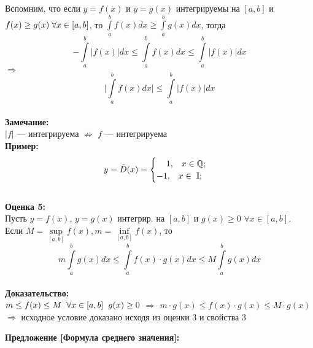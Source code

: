 \documentclass[a4paper,12pt]{article} %
\begin{document}
\begin{enumerate}
     Вспомним, что если $ y = f(x) $ и $ y = g(x) $ интегрируемы на $ [a,b] $ и $ f(x) \geq g(x) \hspace{1 mm} \forall x \in [a, b]$, то $ \int\limits_a^b f(x)dx \geq \int\limits_a^b g(x)dx $, тогда \\ [1 mm]
     $$ - \int\limits_a^b |f(x)| dx \leq \int\limits_a^b f(x) dx \leq \int\limits_a^b |f(x)| dx $$ $\Rightarrow$ \\
     $$ \bigg|\int\limits_a^b f(x)dx\bigg| \leq \int\limits_a^b |f(x)|dx $$ \\ 
     \textbf{Замечание:} \\
     $ |f| $ --- интегрируема $\not\Rightarrow$ $ f $  --- интегрируема \\
     \textbf{Пример:} \\
     \begin{equation*}
    y = \tilde D(x) = \begin{cases}
        \hspace{4 mm}1, \hspace{3 mm} x \in \mathbb{Q};\\
        -1,  \hspace{3 mm} x \in \hspace{1 mm} \mathbb{I};
    \end{cases}
     \end{equation*} \\ [2 mm]
     
    \textbf{Оценка 5:}\\[2mm] Пусть $ y = f(x) $, $ y = g(x) $ интегрир. на $ [a, b] $ и $ g(x) \geq 0 $ $\forall x \in [a, b] $. \\ [2 mm]
    Если $ M = \sup\limits_{[a, b]} f (x), m = \inf\limits_{[a, b]} f(x) $, то \\
    $$ m\int\limits_a^b g(x)dx \leq \int\limits_a^b f(x) \cdot g(x)dx \leq M \int\limits_a^b g(x)dx  $$ \\ [2 mm]
    \textbf{Доказательство:} \\ [2mm]
    $ m \leq f (x) \leq M \hspace{2 mm} \forall x \in [a, b]  \hspace{2 mm} g (x) \geq 0 $ $ \Rightarrow $
    $ m \cdot g(x) \leq f(x) \cdot g(x) \leq M \cdot g (x) $ \\ [2 mm] $ \Rightarrow $ исходное условие доказано исходя из оценки 3 и свойства 3 \\ [2 mm]
    
\end{enumerate}
\textbf{Предложение [Формула среднего значения]: } \\ [2 mm]
\end{document}

